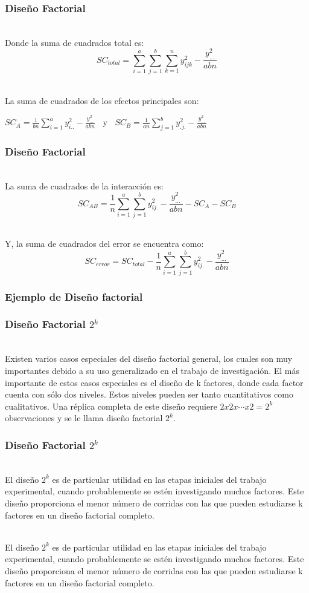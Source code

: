 \documentclass[12pt]{beamer}
\begin{document}
\begin{frame}
\frametitle{Diseño Factorial}
~\\Donde la suma de cuadrados total es:
$$SC_{total}=\sum\limits_{i=1}^a \sum\limits_{j=1}^b \sum\limits_{k=1}^n y^2_{ijk}-\frac{y^2_{\ldots}}{abn}$$

~\\La suma de cuadrados de los efectos principales son:
\begin{center}
$SC_A=\frac{1}{bn}\sum\limits_{i=1}^a y^2_{i..} - \frac{y^2_{\ldots}}{abn}\;\;$ y $\;\;SC_B=\frac{1}{an}\sum\limits_{j=1}^b y^2_{.j.} - \frac{y^2_{\ldots}}{abn}$
\end{center}

\end{frame}

\begin{frame}
\frametitle{Diseño Factorial}
~\\La suma de cuadrados de la interacción es:
$$SC_{AB}=\frac{1}{n}\sum\limits_{i=1}^a\sum\limits_{j=1}^b y^2_{ij.}-\frac{y^2_{\ldots}}{abn}-SC_{A}-SC_{B}$$

~\\Y, la suma de cuadrados del error se encuentra como:
$$SC_{error}=SC_{total}-\frac{1}{n}\sum\limits_{i=1}^a\sum\limits_{j=1}^b y^2_{ij.}-\frac{y^2_{\ldots}}{abn}$$
\end{frame}

\begin{frame}
\frametitle{Ejemplo de Diseño factorial}

\end{frame}

\begin{frame}
\frametitle{Diseño Factorial $2^{k}$}
~\\Existen varios casos especiales del diseño factorial general, los cuales son muy importantes debido a su uso generalizado en el trabajo de investigación. El más importante de estos casos especiales es el diseño de k factores, donde cada factor cuenta con sólo dos niveles. Estos niveles pueden ser tanto cuantitativos como cualitativos. Una réplica completa de este diseño requiere $2 x 2 x\cdots x 2 =2^k$ observaciones y se le llama diseño factorial $2^k$.
\end{frame}

\begin{frame}
\frametitle{Diseño Factorial $ 2^{k} $}
~\\El diseño $2^k$ es de particular utilidad en las etapas iniciales del trabajo experimental, cuando probablemente se estén investigando muchos factores. Este diseño proporciona el menor número de corridas con las que pueden estudiarse k factores en un diseño factorial completo.

~\\El diseño $2^k$ es de particular utilidad en las etapas iniciales del trabajo experimental, cuando probablemente se estén investigando muchos factores. Este diseño proporciona el menor número de corridas con las que pueden estudiarse k factores en un diseño factorial completo.
\end{frame}
\end{document}
